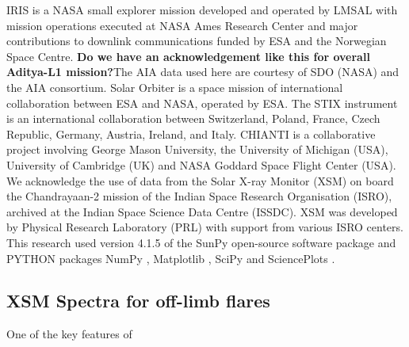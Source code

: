 \documentclass[lineno, pdflatex,sn-mathphys-ay]{sn-jnl}%
\begin{document}
\backmatter

IRIS is a NASA small explorer mission developed and operated by LMSAL with mission operations executed at NASA Ames Research Center and major contributions to downlink communications funded by ESA and the Norwegian Space Centre. {\bf Do we have an acknowledgement like this for overall Aditya-L1 mission?}The AIA data used here are courtesy of SDO (NASA) and the AIA consortium. Solar Orbiter is a space mission of international collaboration between ESA and NASA, operated by ESA. The STIX instrument is an international collaboration between Switzerland, Poland, France, Czech Republic, Germany, Austria, Ireland, and Italy. CHIANTI is a collaborative project involving George Mason University, the University of Michigan (USA), University of Cambridge (UK) and NASA Goddard Space Flight Center (USA). We acknowledge the use of data from the Solar X-ray Monitor (XSM) on board the Chandrayaan-2 mission of the Indian Space Research Organisation (ISRO), archived at the Indian Space Science Data Centre (ISSDC). XSM was developed by Physical Research Laboratory (PRL) with support from various ISRO centers. This research used version 4.1.5 \citep{sunpy_ver} of the SunPy open-source software package \citep{sunpy20} and PYTHON packages NumPy \citep{numpy}, Matplotlib \citep{matpltolib}, SciPy \citep{scipy} and SciencePlots \citep{SciencePlots}.

\begin{appendices}

\section{XSM Spectra for off-limb flares}\label{secA1}

One of the key features of 

\end{appendices}

\end{document}
